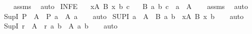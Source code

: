 \begin{isabellebody}
%
\isadelimproof
\ \ %
\endisadelimproof
%
\isatagproof
{}\isamarkupfalse%
\ assms\ \isamarkupfalse%
\ auto%
\endisatagproof
{\isafoldproof}%
%
\isadelimproof
\isanewline
%
\endisadelimproof
\isanewline
{}\isamarkupfalse%
\ INF{}{\isacharunderscore}{\kern0pt}E{\isacharcolon}{\kern0pt}\isanewline
\ \ \ {\isachardoublequoteopen}{\isacharparenleft}{\kern0pt}{\isasymSqinter}x{\isasymin}A{\isachardot}{\kern0pt}\ B\ x{\isacharparenright}{\kern0pt}\ b\ c{\isachardoublequoteclose}\isanewline
\ \ \ {\isachardoublequoteopen}B\ a\ b\ c{\isachardoublequoteclose}\ {\isacharbar}{\kern0pt}\ {\isachardoublequoteopen}a\ {\isasymnotin}\ A{\isachardoublequoteclose}\isanewline
%
\isadelimproof
\ \ %
\endisadelimproof
%
\isatagproof
{}\isamarkupfalse%
\ assms\ \isamarkupfalse%
\ auto%
\endisatagproof
{\isafoldproof}%
%
\isadelimproof
\isanewline
%
\endisadelimproof
\isanewline
{}\isamarkupfalse%
\ Sup{}{\isacharunderscore}{\kern0pt}I{\isacharcolon}{\kern0pt}\ {\isachardoublequoteopen}P\ {\isasymin}\ A\ {\isasymLongrightarrow}\ P\ a\ {\isasymLongrightarrow}\ {\isacharparenleft}{\kern0pt}{\isasymSqunion}A{\isacharparenright}{\kern0pt}\ a{\isachardoublequoteclose}\isanewline
%
\isadelimproof
\ \ %
\endisadelimproof
%
\isatagproof
{}\isamarkupfalse%
\ auto%
\endisatagproof
{\isafoldproof}%
%
\isadelimproof
\isanewline
%
\endisadelimproof
\isanewline
{}\isamarkupfalse%
\ SUP{}{\isacharunderscore}{\kern0pt}I{\isacharcolon}{\kern0pt}\ {\isachardoublequoteopen}a\ {\isasymin}\ A\ {\isasymLongrightarrow}\ B\ a\ b\ {\isasymLongrightarrow}\ {\isacharparenleft}{\kern0pt}{\isasymSqunion}x{\isasymin}A{\isachardot}{\kern0pt}\ B\ x{\isacharparenright}{\kern0pt}\ b{\isachardoublequoteclose}\isanewline
%
\isadelimproof
\ \ %
\endisadelimproof
%
\isatagproof
{}\isamarkupfalse%
\ auto%
\endisatagproof
{\isafoldproof}%
%
\isadelimproof
\isanewline
%
\endisadelimproof
\isanewline
{}\isamarkupfalse%
\ Sup{}{\isacharunderscore}{\kern0pt}I{\isacharcolon}{\kern0pt}\ {\isachardoublequoteopen}r\ {\isasymin}\ A\ {\isasymLongrightarrow}\ r\ a\ b\ {\isasymLongrightarrow}\ {\isacharparenleft}{\kern0pt}{\isasymSqunion}A{\isacharparenright}{\kern0pt}\ a\ b{\isachardoublequoteclose}\isanewline
%
\isadelimproof
\ \ %
\endisadelimproof
%
\isatagproof
{}\isamarkupfalse%
\ auto%
\endisatagproof
{\isafoldproof}%
%
\isadelimproof
\isanewline
%
\endisadelimproof
\isanewline

\end{isabellebody}
